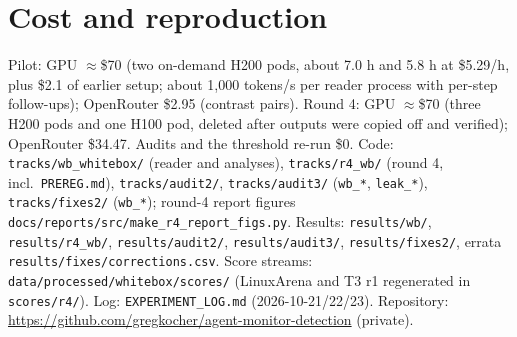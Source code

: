 \documentclass[11pt]{article}
\begin{document}
\section*{Cost and reproduction}
Pilot: GPU $\approx$\$70 (two on-demand H200 pods, about 7.0 h and 5.8 h at \$5.29/h, plus \$2.1 of earlier setup; about 1{,}000 tokens/s per reader process with per-step follow-ups); OpenRouter \$2.95 (contrast pairs). Round 4: GPU $\approx$\$70 (three H200 pods and one H100 pod, deleted after outputs were copied off and verified); OpenRouter \$34.47. Audits and the threshold re-run \$0. Code: \texttt{tracks/wb\_whitebox/} (reader and analyses), \texttt{tracks/r4\_wb/} (round 4, incl.\ \texttt{PREREG.md}), \texttt{tracks/audit2/}, \texttt{tracks/audit3/} (\texttt{wb\_*}, \texttt{leak\_*}), \texttt{tracks/fixes2/} (\texttt{wb\_*}); round-4 report figures \texttt{docs/reports/src/make\_r4\_report\_figs.py}. Results: \texttt{results/wb/}, \texttt{results/r4\_wb/}, \texttt{results/audit2/}, \texttt{results/audit3/}, \texttt{results/fixes2/}, errata \texttt{results/fixes/corrections.csv}. Score streams: \texttt{data/processed/whitebox/scores/} (LinuxArena and T3 r1 regenerated in \texttt{scores/r4/}). Log: \texttt{EXPERIMENT\_LOG.md} (2026-10-21/22/23). Repository: \url{https://github.com/gregkocher/agent-monitor-detection} (private).
\end{document}
